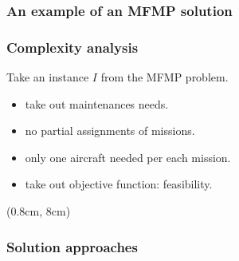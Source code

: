 \begin{frame}[t]
\frametitle{\textbf{An example of an MFMP solution}}
  
\end{frame}


\begin{frame}
\frametitle{\textbf{Complexity analysis}}
  
  Take an instance $I$ from the MFMP problem.
  \pause
  \begin{itemize}[<+->]
    \item take out maintenances needs.
    \item no partial assignments of missions.
    \item only one aircraft needed per each mission.
    \item take out objective function: feasibility.
  \end{itemize}
  
  \begin{block}{}
  \end{block}
  \begin{textblock*}{1.1\textwidth}(0.8cm, 8cm)
    \begin{flushleft}
    \end{flushleft}
  \end{textblock*}
\end{frame}

\begin{frame}
\frametitle{\textbf{Solution approaches}}
  \begin{block}{\textbf{\firsttitleF}}
  \end{block}  

\end{frame}

